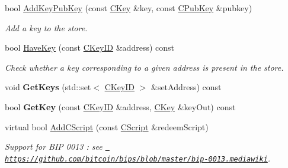 \begin{DoxyCompactItemize}
\item 
\mbox{\label{class_c_basic_key_store_acc2e33f319de88e88f86b0dc79bdcb65}} 
bool \mbox{\hyperlink{class_c_basic_key_store_acc2e33f319de88e88f86b0dc79bdcb65}{Add\+Key\+Pub\+Key}} (const \mbox{\hyperlink{class_c_key}{C\+Key}} \&key, const \mbox{\hyperlink{class_c_pub_key}{C\+Pub\+Key}} \&pubkey)
\begin{DoxyCompactList}\small\item\em Add a key to the store. \end{DoxyCompactList}\item 
\mbox{\label{class_c_basic_key_store_afc99762e3e58f93e198d85ecfdf5804a}} 
bool \mbox{\hyperlink{class_c_basic_key_store_afc99762e3e58f93e198d85ecfdf5804a}{Have\+Key}} (const \mbox{\hyperlink{class_c_key_i_d}{C\+Key\+ID}} \&address) const
\begin{DoxyCompactList}\small\item\em Check whether a key corresponding to a given address is present in the store. \end{DoxyCompactList}\item 
\mbox{\label{class_c_basic_key_store_a41f3895021dae008582ceb55a98b0891}} 
void {\bfseries Get\+Keys} (std\+::set$<$ \mbox{\hyperlink{class_c_key_i_d}{C\+Key\+ID}} $>$ \&set\+Address) const
\item 
\mbox{\label{class_c_basic_key_store_a69328ee642e4234922356f59876e956d}} 
bool {\bfseries Get\+Key} (const \mbox{\hyperlink{class_c_key_i_d}{C\+Key\+ID}} \&address, \mbox{\hyperlink{class_c_key}{C\+Key}} \&key\+Out) const
\item 
\mbox{\label{class_c_basic_key_store_a56249ce3540398999cd397eeb662e836}} 
virtual bool \mbox{\hyperlink{class_c_basic_key_store_a56249ce3540398999cd397eeb662e836}{Add\+C\+Script}} (const \mbox{\hyperlink{class_c_script}{C\+Script}} \&redeem\+Script)
\begin{DoxyCompactList}\small\item\em Support for B\+IP 0013 \+: see \href{https://github.com/bitcoin/bips/blob/master/bip-0013.mediawiki}{\texttt{ https\+://github.\+com/bitcoin/bips/blob/master/bip-\/0013.\+mediawiki}}. \end{DoxyCompactList}\item 

\end{DoxyCompactItemize}
